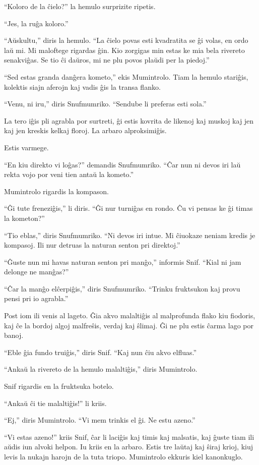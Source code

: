 ``Koloro de la ĉielo?'' la hemulo surprizite ripetis.

``Jes, la ruĝa koloro.''

``Aŭskultu,'' diris la hemulo. ``La ĉielo povas esti kvadratita se ĝi volas, en ordo laŭ mi. Mi maloftege rigardas ĝin. Kio zorgigas min estas ke mia bela rivereto senakviĝas. Se tio ĉi daŭros, mi ne plu povos plaŭdi per la piedoj.''

``Sed estas granda danĝera kometo,'' ekis Mumintrolo. Tiam la hemulo stariĝis, kolektis siajn aferojn kaj vadis ĝis la transa flanko.

``Venu, ni iru,'' diris Snufmumriko. ``Sendube li preferas esti sola.''

La tero iĝis pli agrabla por surtreti, ĝi estis kovrita de likenoj kaj muskoj kaj jen kaj jen kreskis kelkaj floroj. La arbaro alproksimiĝis.

Estis varmege.

``En kiu direkto vi loĝas?'' demandis Snufmumriko. ``Ĉar nun ni devos iri laŭ rekta vojo por veni tien antaŭ la kometo.''

Mumintrolo rigardis la kompason.

``Ĝi tute freneziĝis,'' li diris. ``Ĝi nur turniĝas en rondo. Ĉu vi pensas ke ĝi timas la kometon?''

``Tio eblas,'' diris Snufmumriko. ``Ni devos iri intue. Mi ĉiuokaze neniam kredis je kompasoj. Ili nur detruas la naturan senton pri direktoj.''

``Ĝuste nun mi havas naturan senton pri manĝo,'' informis Snif. ``Kial ni jam delonge ne manĝas?''

``Ĉar la manĝo elĉerpiĝis,'' diris Snufmumriko. ``Trinku fruktsukon kaj provu pensi pri io agrabla.''

Post iom ili venis al lageto. Ĝia akvo malaltiĝis al malprofunda flako kiu fiodoris, kaj ĉe la bordoj algoj malfreŝis, verdaj kaj ŝlimaj. Ĝi ne plu estis ĉarma lago por banoj.

``Eble ĝia fundo truiĝis,'' diris Snif. ``Kaj nun ĉiu akvo elfluas.''

``Ankaŭ la rivereto de la hemulo malaltiĝis,'' diris Mumintrolo.

Snif rigardis en la fruktsuka botelo.

``Ankaŭ ĉi tie malaltiĝis!'' li kriis.

``Ej,'' diris Mumintrolo. ``Vi mem trinkis el ĝi. Ne estu azeno.''

``Vi estas azeno!'' kriis Snif, ĉar li laciĝis kaj timis kaj malsatis, kaj ĝuste tiam ili aŭdis iun alvoki helpon. Iu kriis en la arbaro. Estis tre laŭtaj kaj ŝiraj krioj, kiuj levis la nukajn harojn de la tuta triopo. Mumintrolo ekkuris kiel kanonkuglo.

